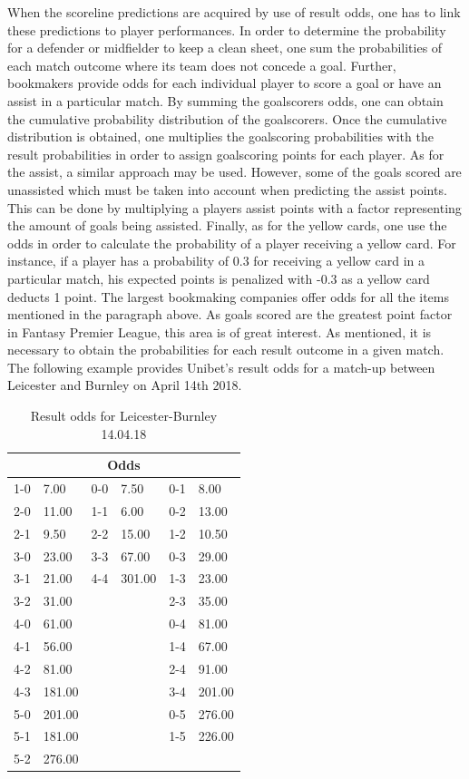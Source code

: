 \newpar

When the scoreline predictions are acquired by use of result odds, one has to link these predictions to player performances. In order to determine the probability for a defender or midfielder to keep a clean sheet, one sum the probabilities of each match outcome where its team does not concede a goal. Further, bookmakers provide odds for each individual player to score a goal or have an assist in a particular match. By summing the goalscorers odds, one can obtain the cumulative probability distribution of the goalscorers. Once the cumulative distribution is obtained, one multiplies the goalscoring probabilities with the result probabilities in order to assign goalscoring points for each player. As for the assist, a similar approach may be used. However, some of the goals scored are unassisted which must be taken into account when predicting the assist points. This can be done by multiplying a players assist points with a factor representing the amount of goals being assisted. Finally, as for the yellow cards, one use the odds in order to calculate the probability of a player receiving a yellow card. For instance, if a player has a probability of 0.3 for receiving a yellow card in a particular match, his expected points is penalized with -0.3 as a yellow card deducts 1 point. 
\newpar
The largest bookmaking companies offer odds for all the items mentioned in the paragraph above. As goals scored are the greatest point factor in Fantasy Premier League, this area is of great interest. As mentioned, it is necessary to obtain the probabilities for each result outcome in a given match. The following example provides Unibet's result odds for a match-up between Leicester and Burnley on April 14th 2018. 

\begin{table}[H]
\centering
\caption{Result odds for Leicester-Burnley 14.04.18}
\label{Leicester-Burnley}
\begin{tabular}{|ll|ll|ll|}
\multicolumn{6}{c}{Odds}                   \\
\hline
1-0 & 7.00   & 0-0 & 7.50   & 0-1 & 8.00   \\
2-0 & 11.00  & 1-1 & 6.00   & 0-2 & 13.00  \\
2-1 & 9.50   & 2-2 & 15.00  & 1-2 & 10.50  \\
3-0 & 23.00  & 3-3 & 67.00  & 0-3 & 29.00  \\
3-1 & 21.00  & 4-4 & 301.00 & 1-3 & 23.00  \\
3-2 & 31.00  &     &        & 2-3 & 35.00  \\
4-0 & 61.00  &     &        & 0-4 & 81.00  \\
4-1 & 56.00  &     &        & 1-4 & 67.00  \\
4-2 & 81.00  &     &        & 2-4 & 91.00  \\
4-3 & 181.00 &     &        & 3-4 & 201.00 \\
5-0 & 201.00 &     &        & 0-5 & 276.00 \\
5-1 & 181.00 &     &        & 1-5 & 226.00 \\
5-2 & 276.00 &     &        &     &        \\
\hline
\end{tabular}
\end{table}

